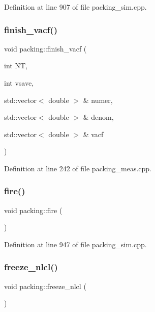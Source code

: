 Definition at line 907 of file packing\+\_\+sim.\+cpp.

\mbox{\label{classpacking_a4eaacbf9a4212c3bdf61315317b21529}} 
\subsubsection{\texorpdfstring{finish\+\_\+vacf()}{finish\_vacf()}}
{\footnotesize\ttfamily void packing\+::finish\+\_\+vacf (\begin{DoxyParamCaption}\item[{int}]{NT,  }\item[{int}]{vsave,  }\item[{std\+::vector$<$ double $>$ \&}]{numer,  }\item[{std\+::vector$<$ double $>$ \&}]{denom,  }\item[{std\+::vector$<$ double $>$ \&}]{vacf }\end{DoxyParamCaption})}



Definition at line 242 of file packing\+\_\+meas.\+cpp.

\mbox{\label{classpacking_af0edc401a0cb530600f0219e24518f23}} 
\subsubsection{\texorpdfstring{fire()}{fire()}}
{\footnotesize\ttfamily void packing\+::fire (\begin{DoxyParamCaption}{ }\end{DoxyParamCaption})}



Definition at line 947 of file packing\+\_\+sim.\+cpp.

\mbox{\label{classpacking_aff094d1084949ed63ca374373e8d312b}} 
\subsubsection{\texorpdfstring{freeze\+\_\+nlcl()}{freeze\_nlcl()}}
{\footnotesize\ttfamily void packing\+::freeze\+\_\+nlcl (\begin{DoxyParamCaption}{ }\end{DoxyParamCaption})}



